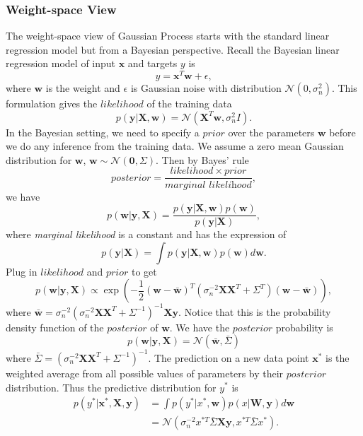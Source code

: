 \documentclass[11pt,a4paper]{article}
\theoremstyle{definition}
\numberwithin{equation}{section}
\let\vec\mathbf
\begin{document}
	\subsubsection{Weight-space View}
	The weight-space view of Gaussian Process starts with the standard linear regression model but from a Bayesian perspective. Recall the Bayesian linear regression model of input $\vec x$ and targets $y$ is
	\begin{equation}
	y = \vec x^T\vec w + \epsilon,
	\end{equation}
	where $\vec w$ is the weight and $\epsilon$ is Gaussian noise with distribution $\mathcal N(0,\sigma^2_n)$. This formulation gives the $likelihood$ of the training data
	\begin{equation}
	p(\vec y|\vec X, \vec w) = \mathcal N(\vec X^T\vec w,\sigma^2_nI).
	\end{equation}
	In the Bayesian setting, we need to specify a $prior$ over the parameters $\vec w$ before we do any inference from the training data\cite[sec 2.1]{RandW}. We assume a zero mean Gaussian distribution for $\vec w$, $\vec w \sim \mathcal N(\vec 0, \Sigma)$. Then by Bayes' rule
	\begin{equation}
	posterior = \frac{likelihood \times prior}{\textit{marginal likelihood}},
	\end{equation}
	we have
	\begin{equation}
	p(\vec w|\vec y, \vec X) = \frac{p(\vec y|\vec X, \vec w)p(\vec w)}{p(\vec y | \vec X)},
	\end{equation}
	where \textit{marginal likelihood} is a constant and has the expression of
	\begin{equation}
	p(\vec y | \vec X) = \int p(\vec y|\vec X, \vec w) p(\vec w)d\vec w.
	\end{equation}
	Plug in $likelihood$ and $prior$ to get
	\begin{equation}
	p(\vec w|\vec y, \vec X) \propto \exp\left(-\frac{1}{2}(\vec w-\vec{\bar w})^T(\sigma^{-2}_n \vec X \vec X^T +\Sigma^T)(\vec w-\vec{\bar w})\right),
	\end{equation}
	where $\vec{\bar w}=\sigma^{-2}_n(\sigma^{-2}_n\vec X\vec X^T+\Sigma^{-1})^{-1}\vec X\vec y$. Notice that this is the probability density function of the $posterior$ of $\vec w$. We have the $posterior$ probability is
	\begin{equation}
	p(\vec w|\vec y, \vec X) = \mathcal N(\vec{\bar w},\bar \Sigma)
	\end{equation}
	where $\bar \Sigma = (\sigma^{-2}_n\vec X\vec X^T+\Sigma^{-1})^{-1}$.
	The prediction on a new data point $\vec x^*$ is the weighted average from all possible values of parameters by their $posterior$ distribution. Thus the predictive distribution for $y^*$ is 
	\begin{equation}\label{weight_space_pred}
	\begin{split}
	p(y^*|\vec x^*,\vec X, \vec y) &= \int p(y^*|x^*,\vec w)p(x|\vec W,\vec y)d\vec w\\
	&=\mathcal N\left(\sigma^{-2}_nx^{*T}\bar \Sigma \vec X\vec y,x^{*T}\bar\Sigma x^*\right).
	\end{split}
	\end{equation}
	
\end{document}
